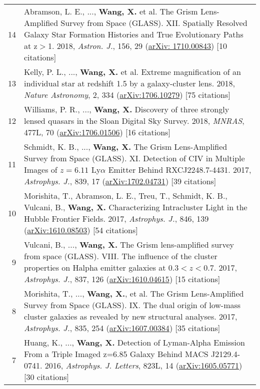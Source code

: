 \documentclass[letterpaper,10pt]{article}
\begin{document}
\begin{longtable}{rp{6.3in}}
14  &   Abramson, L. E., ..., \textbf{Wang, X.} et al. The Grism Lens-Amplified Survey from Space (GLASS). XII. Spatially Resolved Galaxy Star 
    Formation Histories and True Evolutionary Paths at z$>$1. 2018, \textit{Astron. J.}, 156, 29 (\href{https://arxiv.org/abs/1710.00843}{arXiv:
    1710.00843}) [10 citations]  \\
13  &   Kelly, P. L., ..., \textbf{Wang, X.} et al. Extreme magnification of an individual star at redshift 1.5 by a galaxy-cluster lens. 2018, 
    \textit{Nature Astronomy}, 2, 334 (\href{https://arxiv.org/abs/1706.10279}{arXiv:1706.10279}) [75 citations]  \\
12  &   Williams, P. R., ..., \textbf{Wang, X.} Discovery of three strongly lensed quasars in the Sloan Digital Sky Survey. 2018, \textit{MNRAS}, 477L, 
    70 (\href{https://arxiv.org/abs/1706.01506}{arXiv:1706.01506}) [16 citations]  \\
11  &   Schmidt, K. B., ..., \textbf{Wang, X.} The Grism Lens-Amplified Survey from Space (GLASS). XI. Detection of CIV in Multiple Images of $z=6.11$ 
    Ly$\alpha$ Emitter Behind RXCJ2248.7-4431. 2017, \textit{Astrophys. J.}, 839, 17 
    (\href{https://arxiv.org/abs/1702.04731}{arXiv:1702.04731}) [39 citations] \\
10  &   Morishita, T., Abramson, L. E., Treu, T., Schmidt, K. B., Vulcani, B., \textbf{Wang, X.} Characterizing Intracluster Light in the Hubble 
    Frontier Fields. 2017, \textit{Astrophys. J.}, 846, 139 (\href{https://arxiv.org/abs/1610.08503}{arXiv:1610.08503}) [54 citations] \\
9   &   Vulcani, B., ..., \textbf{Wang, X.} The Grism lens-amplified survey from space (GLASS). VIII. The influence of the cluster properties on 
    Halpha emitter galaxies at $0.3<z<0.7$. 2017, \textit{Astrophys. J.}, 837, 126 (\href{https://arxiv.org/abs/1610.04615}{arXiv:1610.04615}) [15 citations]  \\
8   &   Morishita, T., ..., \textbf{Wang, X.}, et al. The Grism Lens-Amplified Survey from Space (GLASS). IX. The dual origin of low-mass cluster 
    galaxies as revealed by new structural analyses. 2017, \textit{Astrophys. J.}, 835, 254 (\href{https://arxiv.org/abs/1607.00384}{arXiv:1607.00384}) 
    [35 citations]  \\
7   &   Huang, K., ..., \textbf{Wang, X.} Detection of Lyman-Alpha Emission From a Triple Imaged z=6.85 Galaxy Behind MACS J2129.4-0741. 2016, 
    \textit{Astrophys. J. Letters}, 823L, 14 (\href{https://arxiv.org/abs/1605.05771}{arXiv:1605.05771}) [30 citations]   \\

\end{longtable}
\end{document}
